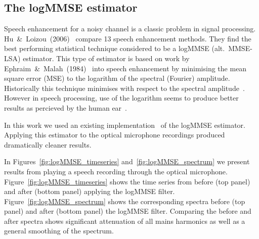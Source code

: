 \documentclass[paper-main.tex]{subfiles}
\begin{document}



\subsection{The logMMSE estimator}
\label{sec:logmmse}

Speech enhancement for a noisy channel is a classic problem in signal processing. 
Hu~\&~Loizou~(2006)~\cite{SubjectiveComparison} compare 13 speech enhancement methods. 
They find the best performing statistical technique considered to be a logMMSE (alt.\ MMSE-LSA) estimator. 
This type of estimator is based on work by Ephraim~\&~Malah~(1984)~\cite{Ephraim1984SpeechEU_logMMSE} into speech enhancement by minimising the mean square error (MSE) to the logarithm of the spectral (Fourier) amplitude.
Historically this technique minimises with respect to the spectral amplitude~\cite{EphraimSpeechEU_MMSE}. 
However in speech processing, use of the logarithm seems to produce better results as percieved by the human ear~\cite{SubjectiveComparison}.


In this work we used an existing implementation~\cite{logmmse} of the logMMSE estimator. 
Applying this estimator to the optical microphone recordings produced dramatically cleaner results. 

In Figures~\ref{fig:logMMSE_timeseries} and~\ref{fig:logMMSE_spectrum} we present results from playing a speech recording through the optical microphone. 
Figure~\ref{fig:logMMSE_timeseries} shows the time series from before (top panel) and after (bottom panel) applying the logMMSE filter. 
Figure~\ref{fig:logMMSE_spectrum} shows the corresponding spectra before (top panel) and after (bottom panel) the logMMSE filter. 
Comparing the before and after spectra shows significant attenuation of all mains harmonics as well as a general smoothing of the spectrum. 
\end{document}
